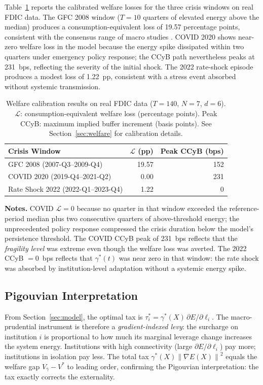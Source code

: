 \documentclass[11pt]{article}
\theoremstyle{definition}
\newcommand{\grad}{\nabla}
\newcommand{\norm}[1]{\left\|#1\right\|}
\begin{document}
Table~\ref{tab:welfare} reports the calibrated welfare losses for the three
crisis windows on real FDIC data.  The GFC 2008 window ($T = 10$ quarters
of elevated energy above the median) produces a consumption-equivalent loss of
19.57 percentage points, consistent with the consensus range of macro studies
\citep{greenwald2020financial}.
COVID 2020 shows near-zero welfare loss in the model because the
energy spike dissipated within two quarters under emergency policy response;
the CCyB path nevertheless peaks at 231~bps, reflecting the severity of the
initial shock.  The 2022 rate-shock episode produces a modest loss of 1.22~pp,
consistent with a stress event absorbed without systemic transmission.

\begin{table}[htbp]
\centering
\caption{Welfare calibration results on real FDIC data ($T=140$, $N=7$, $d=6$).
$\mathcal{L}$: consumption-equivalent welfare loss (percentage points).
Peak CCyB: maximum implied buffer increment (basis points).
See Section~\ref{sec:welfare} for calibration details.}
\label{tab:welfare}
\begin{tabular}{lrr}
\toprule
Crisis Window & $\mathcal{L}$ (pp) & Peak CCyB (bps) \\
\midrule
GFC 2008 (2007-Q3--2009-Q4)       & 19.57 & 152 \\
COVID 2020 (2019-Q4--2021-Q2)      &  0.00 & 231 \\
Rate Shock 2022 (2022-Q1--2023-Q4) &  1.22 &   0 \\
\bottomrule
\end{tabular}
\end{table}

\noindent\textbf{Notes.}  COVID $\mathcal{L} = 0$ because no quarter in that
window exceeded the reference-period median plus two consecutive quarters of
above-threshold energy; the unprecedented policy response compressed the crisis
duration below the model's persistence threshold.  The COVID CCyB peak of
231~bps reflects that the \emph{fragility level} was extreme even though the
welfare loss was averted.  The 2022 CCyB $= 0$~bps reflects that
$\gamma^*(t)$ was near zero in that window: the rate shock was absorbed by
institution-level adaptation without a systemic energy spike.

\subsection{Pigouvian Interpretation}

From Section~\ref{sec:model}, the optimal tax is $\tau_i^* = \gamma^*(X)\,
\partial E/\partial\ell_i$.  The macro-prudential instrument is therefore a
\emph{gradient-indexed levy}: the surcharge on institution $i$ is proportional to
how much its marginal leverage change increases the system energy.  Institutions
with high connectivity (large $\partial E/\partial\ell_i$) pay more; institutions
in isolation pay less.  The total tax $\gamma^*(X)\norm{\grad E(X)}^2$ equals
the welfare gap $V_{\bar\gamma} - V^*$ to leading order, confirming the
Pigouvian interpretation: the tax exactly corrects the externality.
\end{document}
